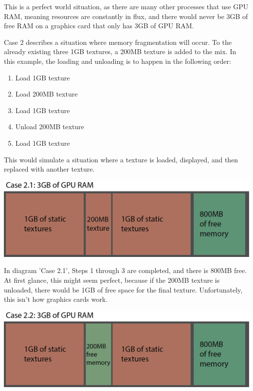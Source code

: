 \begin{fullwidth}
This is a perfect world situation, as there are many other processes that use GPU RAM, meaning resources are constantly in flux, and there would never be 3GB of free RAM on a graphics card that only has 3GB of GPU RAM.

Case 2 describes a situation where memory fragmentation will occur. To the already existing three 1GB textures, a 200MB texture is added to the mix. In this example, the loading and unloading is to happen in the following order:

\begin{enumerate}
\item Load 1GB texture
\item Load 200MB texture
\item Load 1GB texture
\item Unload 200MB texture
\item Load 1GB texture
\end{enumerate}

This would simulate a situation where a texture is loaded, displayed, and then replaced with another texture. 

\begin{center}
\includegraphics{./img/11.6/memory-frag-2.png}
\end{center}

In diagram 'Case 2.1', Steps 1 through 3 are completed, and there is 800MB free. At first glance, this might seem perfect, because if the 200MB texture is unloaded, there would be 1GB of free space for the final texture. Unfortunately, this isn't how graphics cards work.

\begin{center}
\includegraphics{./img/11.6/memory-frag-3.png}
\end{center}


\end{fullwidth}
